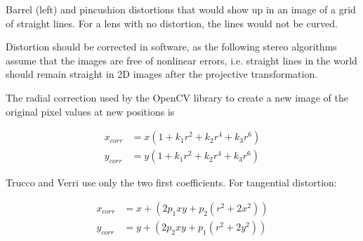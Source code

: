 {Barrel (left) and pincushion distortions that would show up in an image of a grid of straight lines. For a lens with no distortion, the lines would not be curved.}

Distortion should be corrected in software, as the following stereo algorithms assume that the images are free of nonlinear errors, i.e. straight lines in the world should remain straight in 2D images after the projective transformation.

The radial correction used by the OpenCV library to create a new image of the original pixel values at new positions \cite{opencv} is %

\begin{align}
	x_{corr} &= x(1 + k_1 r^2 + k_2 r^4 + k_3 r^6)\\
	y_{corr} &= y(1 + k_1 r^2 + k_2 r^4 + k_3 r^6)
\end{align}



Trucco and Verri \cite{trucco1998introductory} use only the two first coefficients. For tangential distortion:

\begin{align}
x_{corr} &= x + (2 p_1 x y + p_2 (r^2 + 2 x^2))\\
y_{corr} &= y + (2 p_2 x y + p_1 (r^2 + 2 y^2))
\end{align}


